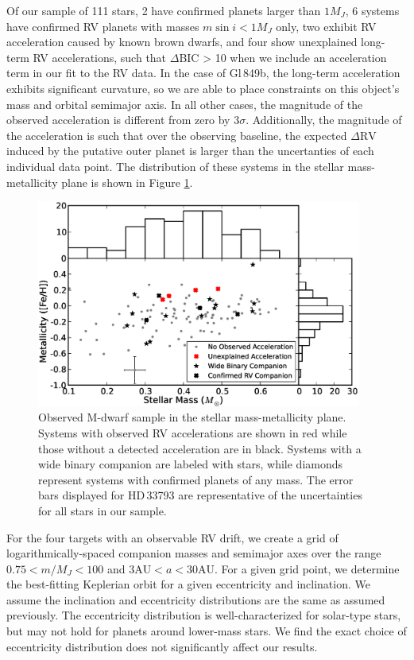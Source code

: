 Of our sample of 111 stars, 2 have confirmed planets larger than $1 M_J$, 6 systems have confirmed RV planets with masses $m \sin i < 1 M_J$ only, two exhibit RV acceleration caused by known brown dwarfs, and four show unexplained long-term RV accelerations, such that $\Delta$BIC > 10 when we include an acceleration term in our fit to the RV data. In the case of Gl\,849b, the long-term acceleration exhibits significant curvature, so we are able to place constraints on this object's mass and orbital semimajor axis. In all other cases, the magnitude of the observed acceleration is different from zero by $3\sigma$. Additionally, the magnitude of the acceleration is such that over the observing baseline, the expected $\Delta\textrm{RV}$ induced by the putative outer planet is larger than the uncertanties of each individual data point. The distribution of these systems in the stellar mass-metallicity plane is shown in Figure \ref{massmetal}.

 
\begin{figure}[htbp]
\centerline{\includegraphics[width=0.95\textwidth,trim={0 0 0 0}, clip=true]{chapter3/f5.eps}}
\caption[Observed M-dwarf sample in the stellar mass-metallicity plane]{Observed M-dwarf sample in the stellar mass-metallicity plane. Systems with observed RV accelerations are shown in red while those without a detected acceleration are in black. Systems with a wide binary companion are labeled with stars, while diamonds represent systems with confirmed planets of any mass. The error bars displayed for HD\,33793 are representative of the uncertainties for all stars in our sample.
  }
\label{massmetal}
\end{figure}


For the four targets with an observable RV drift, we create a grid of logarithmically-spaced companion masses and semimajor axes over the range $0.75 < m/M_J < 100$ and $3 \textrm{AU} < a < 30 \textrm{AU}$. For a given grid point, we determine the best-fitting Keplerian orbit for a given eccentricity and inclination. We assume the inclination and eccentricity distributions are the same as assumed previously. The eccentricity distribution is well-characterized for solar-type stars, but may not hold for planets around lower-mass stars. We find the exact choice of eccentricity distribution does not significantly affect our results.

